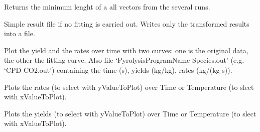 \documentclass[letterpaper,10pt,english]{sphinxmanual}
\begin{document}
\begin{fulllineitems}
\begin{fulllineitems}
\end{fulllineitems}


\begin{fulllineitems}
\label{FittingClasses:Models.Model.minLengthOfVectors}
Returns the minimum lenght of a all vectors from the several runs.

\end{fulllineitems}


\begin{fulllineitems}
\label{FittingClasses:Models.Model.mkSimpleResultFiles}
Simple result file if no fitting is carried out. Writes only the transformed results into a file.

\end{fulllineitems}


\begin{fulllineitems}
\label{FittingClasses:Models.Model.plot}
Plot the yield and the rates over time with two curves: one is the original data, the other the fitting curve. Also file `PyrolysisProgramName-Species.out' (e.g. `CPD-CO2.out') containing the time (s), yields (kg/kg), rates (kg/(kg s)).

\end{fulllineitems}


\begin{fulllineitems}
\label{FittingClasses:Models.Model.pltRate}
Plots the rates (to select with yValueToPlot) over Time or Temperature (to slect with xValueToPlot).

\end{fulllineitems}


\begin{fulllineitems}
\label{FittingClasses:Models.Model.pltYield}
Plots the yields (to select with yValueToPlot) over Time or Temperature (to slect with xValueToPlot).


\end{fulllineitems}
\end{fulllineitems}
\end{document}
